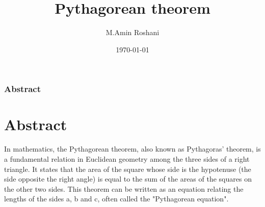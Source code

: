 \documentclass{beamer}
\title{Pythagorean theorem}
\author{M.Amin Roshani}
\institute{University of Tehran}
\date{\today}
\begin{document}
\maketitle




\begin{frame}
\tableofcontents
\end{frame}

\begin{frame}
\frametitle{Abstract}
\section{Abstract}
In mathematics, the Pythagorean theorem, also known as Pythagoras' theorem, is a fundamental relation in Euclidean geometry among the three sides of a right triangle. It states that the area of the square whose side is the hypotenuse (the side opposite the right angle) is equal to the sum of the areas of the squares on the other two sides. This theorem can be written as an equation relating the lengths of the sides a, b and c, often called the "Pythagorean equation".
\end{frame}
\end{document}
